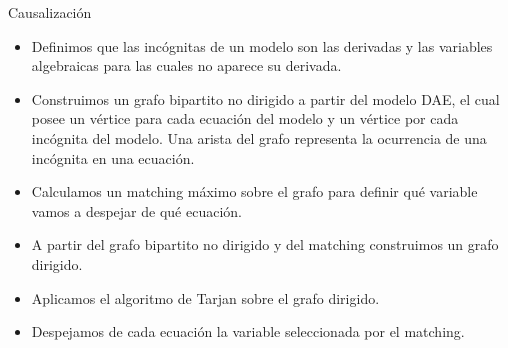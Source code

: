 \begin{frame}{Causalización}
    \begin{itemize}
        \item<1-> Definimos que las incógnitas de un modelo son las derivadas y las variables algebraicas para las cuales no aparece su derivada.
        \item<2-> Construimos un grafo bipartito no dirigido a partir del modelo DAE, el cual posee un vértice para cada ecuación del modelo y un vértice por cada incógnita del modelo. Una arista del grafo representa la ocurrencia de una incógnita en una ecuación.
        \item<3-> Calculamos un matching máximo sobre el grafo para definir qué variable vamos a despejar de qué ecuación.
        \item<4-> A partir del grafo bipartito no dirigido y del matching construimos un grafo dirigido.
        \item<4-> Aplicamos el algoritmo de Tarjan sobre el grafo dirigido.
        \item<5-> Despejamos de cada ecuación la variable seleccionada por el matching.
    \end{itemize}
\end{frame}

